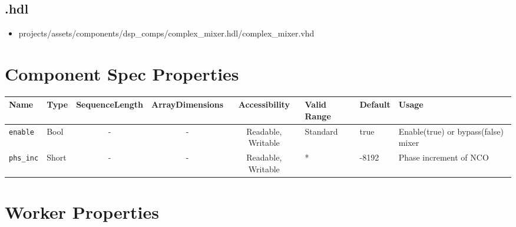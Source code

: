 \subsection*{\comp.hdl}
\begin{itemize}
	\item projects/assets/components/dsp\_comps/complex\_mixer.hdl/complex\_mixer.vhd
        
\end{itemize}

\begin{landscape}
	\section*{Component Spec Properties}
	\begin{scriptsize}
		\begin{tabular}{|p{3cm}|p{1.5cm}|c|c|c|p{1.5cm}|p{1cm}|p{7cm}|}
			\hline
			\rowcolor{blue}
			Name               & Type   & SequenceLength & ArrayDimensions & Accessibility      & Valid Range & Default & Usage                                                                         \\
			\hline
			\verb+enable+      & Bool   & -              & -               & Readable, Writable & Standard    & true    & Enable(true) or bypass(false) mixer                                           \\
			\hline
			\verb+phs_inc+     & Short  & -              & -               & Readable, Writable & *           & -8192   & Phase increment of NCO \\
			\hline

		\end{tabular}
	\end{scriptsize}

	\section*{Worker Properties}

\end{landscape}
